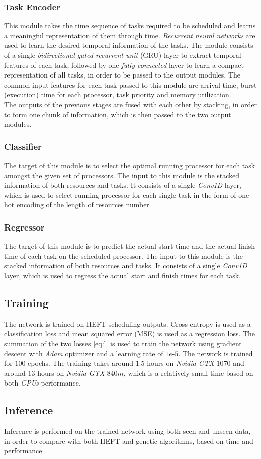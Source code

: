 \subsubsection{Task Encoder}
This module takes the time sequence of tasks required to be scheduled and learns a meaningful representation of them through time. \emph{Recurrent neural networks} are used to learn the desired temporal information of the tasks. The module consists of a single \emph{bidirectional gated recurrent unit} (GRU) \cite{chung2014empirical} layer to extract temporal features of each task, followed by one \emph{fully connected} layer to learn a compact representation of all tasks, in order to be passed to the output modules. The common input features for each task passed to this module are arrival time, burst (execution) time for each processor, task priority and memory utilization. \\

The outputs of the previous stages are fused with each other by stacking, in order to form one chunk of information, which is then passed to the two output modules. \\

\subsubsection{Classifier}
The target of this module is to select the optimal running processor for each task amongst the given set of processors. The input to this module is the stacked information of both resources and tasks. It consists of a single \emph{Conv1D} layer, which is used to select running processor for each single task in the form of one hot encoding of the length of resources number. \\

\subsubsection{Regressor}
The target of this module is to predict the actual start time and the actual finish time of each task on the scheduled processor. The input to this module is the stacked information of both resources and tasks. It consists of a single \emph{Conv1D} layer, which is used to regress the actual start and finish times for each task. 

\subsection{Training}
The network is trained on HEFT scheduling outputs. Cross-entropy is used as a classification loss and mean squared error (MSE) is used as a regression loss. The summation of the two losses \ref{eq:l} is used to train the network using gradient descent with \emph{Adam} optimizer and a learning rate of $1e$-$5$. The network is trained for $100$ epochs. The training takes around $1.5$ hours on \emph{Nvidia GTX} $1070$ and around $13$ hours on \emph{Nvidia GTX} $840m$, which is a relatively small time based on both \emph{GPUs} performance.

\subsection{Inference}
Inference is performed on the trained network using both seen and unseen data, in order to compare with both HEFT and genetic algorithms, based on time and performance.